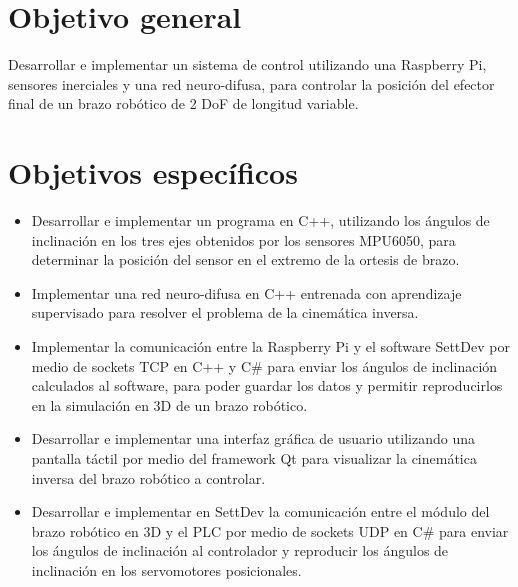 \section{Objetivo general}

Desarrollar e implementar un sistema de control utilizando una Raspberry Pi, sensores inerciales y una red neuro-difusa, para controlar la posición del efector final de un brazo robótico de 2 DoF de longitud variable.

\newpage
\section{Objetivos específicos}
\begin{itemize}
	
	\item Desarrollar e implementar un programa en C++, utilizando los ángulos de inclinación en los tres ejes obtenidos por los sensores MPU6050, para determinar la posición del sensor en el extremo de la ortesis de brazo.
	
	\item Implementar una red neuro-difusa en C++ entrenada con aprendizaje supervisado para resolver el problema de la cinemática inversa.
	
	\item Implementar la comunicación entre la Raspberry Pi y el software SettDev por medio de sockets TCP en C++ y C\# para enviar los ángulos de inclinación calculados al software, para poder guardar los datos y permitir reproducirlos en la simulación en 3D de un brazo robótico.
	
	\item Desarrollar e implementar una interfaz gráfica de usuario utilizando una pantalla táctil por medio del framework Qt para visualizar la cinemática inversa del brazo robótico a controlar.
	
	\item Desarrollar e implementar en SettDev la comunicación entre el módulo del brazo robótico en 3D y el PLC por medio de sockets UDP en C\# para enviar los ángulos de inclinación al controlador y reproducir los ángulos de inclinación en los servomotores posicionales.
	
\end{itemize}